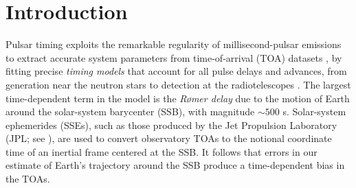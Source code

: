 \documentclass[iop,apj,twocolappendix]{emulateapj}
\begin{document}

\section{Introduction}
\label{sec:intro}

Pulsar timing exploits the remarkable regularity of millisecond-pulsar emissions to extract accurate system parameters from time-of-arrival (TOA) datasets \citep{2012hpa..book.....L},
by fitting precise \emph{timing models} that account for all pulse delays and advances, from generation near the neutron stars to detection at the radiotelescopes \citep{2013CQGra..30v4001L}.
The largest time-dependent term in the model is the \emph{R{\o}mer delay} \citep{Roemer1676} due to the motion of Earth around the solar-system barycenter (SSB), with magnitude $\sim 500$ s. Solar-system ephemerides (SSEs), such as those produced by the Jet Propulsion Laboratory (JPL; see \citealt{2009IPNPR.178C...1F,2014IPNPR.196C...1F,de435,de436,de438}), are used to convert observatory TOAs to the notional coordinate time of an inertial frame centered at the SSB.
It follows that errors in our estimate of Earth's trajectory around the SSB produce a time-dependent bias in the TOAs.
\end{document}
